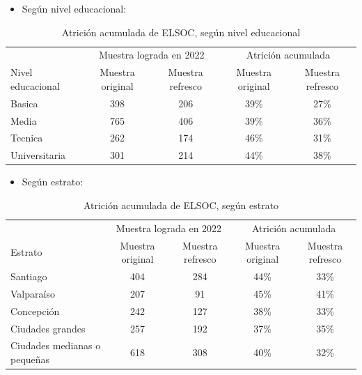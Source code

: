 \documentclass[
  12pt,
]{book}
\providecommand{\tightlist}{%
  \setlength{\itemsep}{0pt}\setlength{\parskip}{0pt}}
\begin{document}
\begin{itemize}
\tightlist
\item
  Según nivel educacional:
\end{itemize}

\begin{table}

\caption{\label{tab:tabla-atricion-educ}Atrición acumulada de ELSOC, según nivel educacional}
\centering
\begin{tabular}[t]{l|c|c|c|c}
\hline
\multicolumn{1}{c|}{ } & \multicolumn{2}{c|}{Muestra lograda en 2022} & \multicolumn{2}{c}{Atrición acumulada} \\
\cline{2-3} \cline{4-5}
Nivel educacional & Muestra original & Muestra refresco & Muestra original & Muestra refresco\\
\hline
Basica & 398 & 206 & 39\% & 27\%\\
\hline
Media & 765 & 406 & 39\% & 36\%\\
\hline
Tecnica & 262 & 174 & 46\% & 31\%\\
\hline
Universitaria & 301 & 214 & 44\% & 38\%\\
\hline
\end{tabular}
\end{table}

\begin{itemize}
\tightlist
\item
  Según estrato:
\end{itemize}

\begin{table}

\caption{\label{tab:tabla-atricion-estrato}Atrición acumulada de ELSOC, según estrato}
\centering
\begin{tabular}[t]{l|c|c|c|c}
\hline
\multicolumn{1}{c|}{ } & \multicolumn{2}{c|}{Muestra lograda en 2022} & \multicolumn{2}{c}{Atrición acumulada} \\
\cline{2-3} \cline{4-5}
Estrato & Muestra original & Muestra refresco & Muestra original & Muestra refresco\\
\hline
Santiago & 404 & 284 & 44\% & 33\%\\
\hline
Valparaíso & 207 & 91 & 45\% & 41\%\\
\hline
Concepción & 242 & 127 & 38\% & 33\%\\
\hline
Ciudades
grandes & 257 & 192 & 37\% & 35\%\\
\hline
Ciudades medianas
o pequeñas & 618 & 308 & 40\% & 32\%\\
\hline
\end{tabular}
\end{table}
\end{document}
